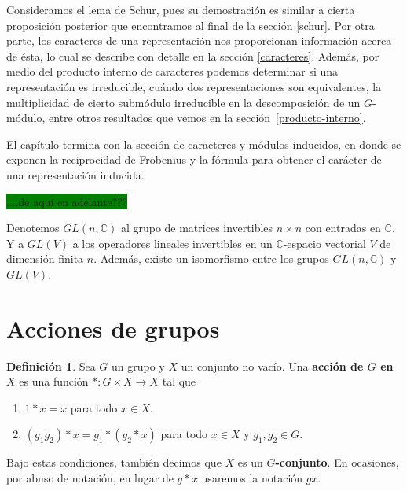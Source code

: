 \documentclass[12pt]{book}
\theoremstyle{definition}
\newtheorem{definition}[theorem]{Definición}
\newcounter{in}
\newcounter{ini}
\begin{document}
Consideramos el lema de Schur, pues su demostración es similar a
cierta proposición posterior que encontramos al final de la sección
\ref{schur}. Por otra parte, los caracteres de una representación nos
proporcionan información acerca de ésta, lo cual se describe con detalle en la
sección \ref{caracteres}. Además, por medio del producto interno de
caracteres podemos determinar si una
representación es irreducible, cuándo dos representaciones son
equivalentes, la multiplicidad de cierto submódulo irreducible en la
descomposición de un $G$-módulo, entre otros resultados que vemos en la
sección~\ref{producto-interno}. 

El capítulo termina con la sección de caracteres y módulos inducidos,
en donde se exponen la reciprocidad de Frobenius y la fórmula para
obtener el carácter de una representación inducida.


\bigskip
{\setlength{\fboxsep}{0pt}\colorbox{green}{....de aquí en adelante???}}

Denotemos $GL(n,\mathbb{C})$ al grupo de matrices
invertibles  $n \times n$ con entradas en $\mathbb{C}$.  
Y a $GL(V)$ a los operadores lineales invertibles en un
$\mathbb{C}$-espacio vectorial $V$ de dimensión finita $n$.
Además, existe un isomorfismo entre los grupos $GL(n,\mathbb{C})$ y $GL(V)$.

\section{Acciones de grupos}
\label{acc-grup}

\begin{definition}
  Sea $G$ un grupo y $X$ un conjunto no vacío. Una  \textbf{acción de $G$
  en $X$} es una función $*:G \times X \rightarrow X$ tal que
\begin{enumerate}
\item $1*x=x$ para todo $x\in X.$
\item $(g_{1}g_{2})*x=g_{1}*(g_{2}*x)$ para todo $x\in X$ y $g_{1},g_{2}\in G.$
\end{enumerate}
   Bajo estas condiciones, también decimos que $X$ es un \textbf{$G$-conjunto}. En ocasiones, por
   abuso de notación, en lugar de $g*x$ usaremos la notación $gx.$
\end{definition}
\end{document}
